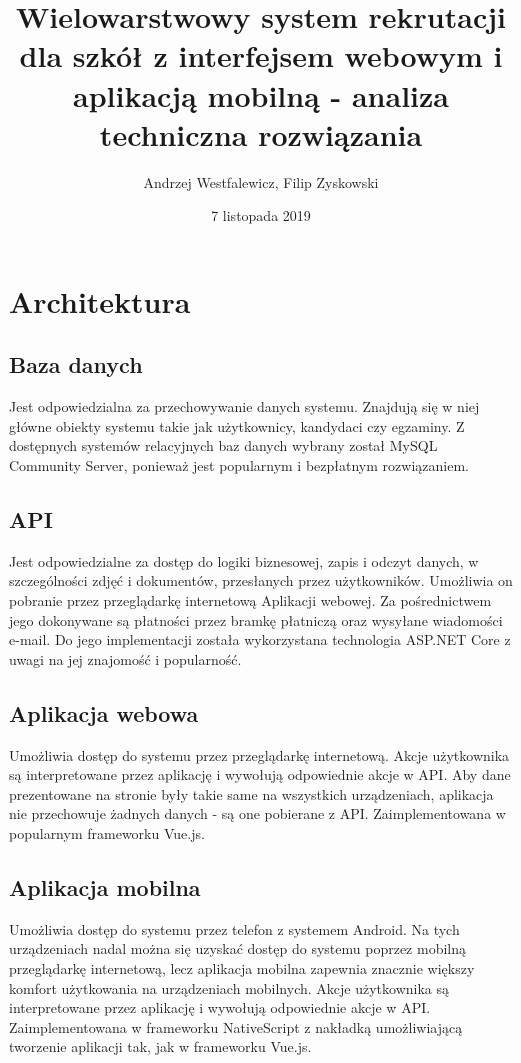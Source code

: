 \documentclass{article}
\title{Wielowarstwowy system rekrutacji dla szkół z interfejsem webowym i aplikacją mobilną - analiza techniczna rozwiązania}
\author{Andrzej Westfalewicz, Filip Zyskowski}
\date{7 listopada 2019}
\begin{document}
\begin{titlepage}
\maketitle
\end{titlepage}

\tableofcontents

\pagebreak

\section{Architektura}
\subsection{Baza danych}
Jest odpowiedzialna za przechowywanie danych systemu. Znajdują się w niej główne obiekty systemu takie jak użytkownicy, kandydaci czy egzaminy. Z dostępnych systemów relacyjnych baz danych wybrany został MySQL Community Server, ponieważ jest popularnym i bezpłatnym rozwiązaniem.
\subsection{API}
Jest odpowiedzialne za dostęp do logiki biznesowej, zapis i odczyt danych, w szczególności zdjęć i dokumentów, przesłanych przez użytkowników. Umożliwia on pobranie przez przeglądarkę internetową Aplikacji webowej. Za pośrednictwem jego dokonywane są płatności przez bramkę płatniczą oraz wysyłane wiadomości e-mail. Do jego implementacji została wykorzystana technologia ASP.NET Core z uwagi na jej znajomość i popularność.
\subsection{Aplikacja webowa}
Umożliwia dostęp do systemu przez przeglądarkę internetową. Akcje użytkownika są interpretowane przez aplikację i wywołują odpowiednie akcje w API. Aby dane prezentowane na stronie były takie same na wszystkich urządzeniach, aplikacja nie przechowuje żadnych danych - są one pobierane z API. Zaimplementowana w popularnym frameworku Vue.js.
\subsection{Aplikacja mobilna}
Umożliwia dostęp do systemu przez telefon z systemem Android. Na tych urządzeniach nadal można się uzyskać dostęp do systemu poprzez mobilną przeglądarkę internetową, lecz aplikacja mobilna zapewnia znacznie większy komfort użytkowania na urządzeniach mobilnych. Akcje użytkownika są interpretowane przez aplikację i wywołują odpowiednie akcje w API. Zaimplementowana w frameworku NativeScript z nakładką umożliwiającą tworzenie aplikacji tak, jak w frameworku Vue.js.
\end{document}
